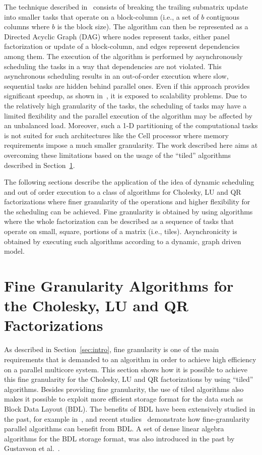 \documentclass{article}
\begin{document}
The technique described in~\cite{Kurzak:2006:ILA,para06} consists of
breaking the trailing submatrix update into smaller tasks that operate
on a block-column (i.e., a set of $b$ contiguous columns where $b$ is
the block size). The algorithm can then be represented as a Directed
Acyclic Graph (DAG) where nodes represent tasks, either panel
factorization or update of a block-column, and edges represent
dependencies among them. The execution of the algorithm is performed
by asynchronously scheduling the tasks in a way that dependencies are
not violated. This asynchronous scheduling results in an out-of-order
execution where slow, sequential tasks are hidden behind parallel
ones. 
Even if this approach provides significant speedup, as shown
in~\cite{Kurzak:2006:ILA, para06}, it is exposed to scalability
problems. Due to the relatively high granularity of the tasks, the
scheduling of tasks may have a limited flexibility and the parallel
execution of the algorithm may be affected by an unbalanced
load. Moreover, such a 1-D partitioning of the computational tasks is
not suited for such architectures like the Cell processor where memory
requirements impose a much smaller granularity.
The work described here aims at overcoming these limitations based on
the usage of the ``tiled'' algorithms described in
Section~\ref{sec:tiled}. 

The following sections describe the application of the idea of
dynamic scheduling and out of order execution to a class of algorithms
for Cholesky, LU and QR factorizations where finer granularity of the
operations and higher flexibility for the scheduling can be achieved. 
Fine granularity is obtained by using algorithms where the whole
factorization can be described as a sequence of tasks that operate on
small, square, portions of a matrix (i.e., tiles). Asynchronicity is
obtained by executing such algorithms according to a dynamic, graph
driven model.



\section{Fine Granularity Algorithms for the Cholesky, LU and QR Factorizations}
\label{sec:tiled}

As described in Section~\ref{sec:intro}, fine granularity is one of
the main requirements that is demanded to an algorithm in order to
achieve high efficiency on a parallel multicore system. This section
shows how it is possible to achieve this fine granularity for the
Cholesky, LU and QR factorizations by using ``tiled''
algorithms. Besides providing fine granularity, the use of tiled
algorithms also makes it possible to exploit more efficient storage
format for the data such as Block Data Layout (BDL). The benefits of
BDL have been extensively studied in the past, for example
in~\cite{670985,1014508}, and recent studies~\cite{1248397,tiledqr}
demonstrate how fine-granularity parallel algorithms can benefit from
BDL. A set of dense linear algebra algorithms for the BDL storage
format, was also introduced in the past by Gustavson et
al.~\cite{1014508,670985}.
\end{document}
